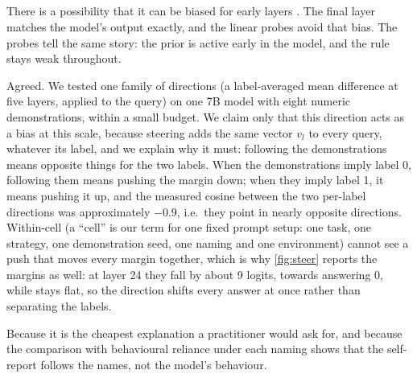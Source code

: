 \newpage

\subsection*{}


There is a possibility that it can be biased for early layers \citep{belrose2023eliciting}.
The final layer matches the model's output exactly, and the linear probes avoid that bias. The probes tell the same story: the prior is active early in the model, and the rule stays weak throughout.


Agreed. We tested one family of directions (a label-averaged mean difference at five layers, applied to the query) on one 7B model with eight numeric demonstrations, within a small budget. We claim only that this direction acts as a bias at this scale, because steering adds the same vector $v_l$ to every query, whatever its label, and we explain why it must: following the demonstrations means opposite things for the two labels. When the demonstrations imply label 0, following them means pushing the margin down; when they imply label 1, it means pushing it up, and the measured cosine between the two per-label directions was approximately $-0.9$, i.e.\ they point in nearly opposite directions. Within-cell \AUROC (a ``cell'' is our term for one fixed prompt setup: one task, one strategy, one demonstration seed, one naming and one environment) cannot see a push that moves every margin together, which is why \autoref{fig:steer} reports the margins as well: at layer 24 they fall by about 9 logits, towards answering 0, while \AUROC stays flat, so the direction shifts every answer at once rather than separating the labels.


Because it is the cheapest explanation a practitioner would ask for, and because the comparison with behavioural reliance under each naming shows that the self-report follows the names, not the model's behaviour.

\newpage
\subsection*{}

